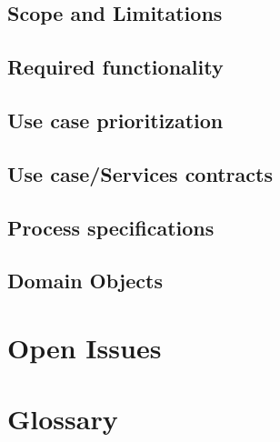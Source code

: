 \documentclass[10pt,a4paper]{article}
\begin{document}
\subsection{Scope and Limitations}

\subsection{Required functionality}
\subsection{Use case prioritization}
\subsection{Use case/Services contracts}
\subsection{Process specifications}
\subsection{Domain Objects}

\section{Open Issues}
\section{Glossary}
\end{document}

